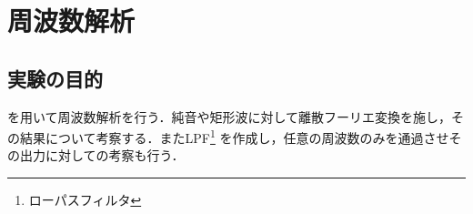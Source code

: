\chapter{周波数解析}
\section{実験の目的}
\matlab を用いて周波数解析を行う．純音や矩形波に対して離散フーリエ変換を施し，その結果について考察する．またLPF\footnote{ローパスフィルタ} を作成し，任意の周波数のみを通過させその出力に対しての考察も行う．